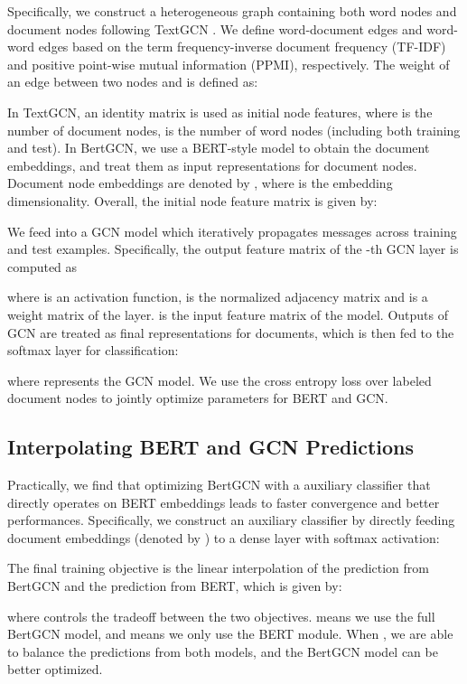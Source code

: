 \documentclass[11pt,a4paper]{article}
\begin{document}
Specifically, we construct a heterogeneous graph containing both word nodes and document nodes following TextGCN \citep{yao2019graph}. We define word-document edges and word-word edges based on the term frequency-inverse document frequency (TF-IDF) and positive point-wise mutual information (PPMI), respectively. The weight of an edge between two nodes  and  is defined as:

In TextGCN, an identity matrix  is used as initial node features, where  is the number of document nodes,  is the number of word nodes (including both training and test). 
In BertGCN, we use a BERT-style model  to obtain the  document embeddings, and treat them as input representations for document nodes. 
Document node embeddings are denoted by , where  is the embedding dimensionality.
Overall, the initial node feature matrix is given by:

We feed  into a GCN model \citep{kipf2016semi} which iteratively propagates messages across training and test examples. Specifically, the output feature matrix of the -th GCN layer  is computed as

where  is an activation function,  is the normalized adjacency matrix and  is a weight matrix of the layer.  is the input feature matrix of the model.
Outputs of GCN are treated as final representations for documents, which is then fed to the softmax layer for classification:

where  represents the GCN model. 
We use the cross entropy loss over labeled document nodes to jointly optimize parameters for BERT and GCN.


 \subsection{Interpolating BERT and GCN Predictions}
Practically, we find that optimizing BertGCN with a auxiliary classifier that directly operates on BERT embeddings leads to faster convergence and better performances. 
Specifically, we construct an auxiliary classifier by directly feeding document embeddings (denoted by ) to a dense layer with softmax activation:

The final training objective is the linear interpolation of the prediction from BertGCN and the prediction from BERT, which is given by:
 
where  controls the tradeoff between the two objectives. 
 means we use the full BertGCN model, and  means we only use the BERT module. When , we are able to balance the predictions from both models, and the BertGCN model can be better optimized.
\end{document}

